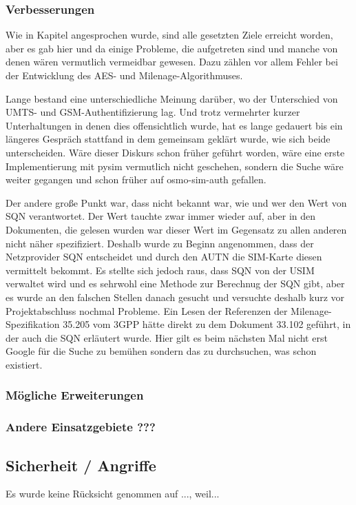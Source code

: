 		\subsubsection{Verbesserungen}
		Wie in Kapitel  angesprochen wurde, sind alle gesetzten Ziele
		erreicht worden, aber es gab hier und da einige Probleme, die aufgetreten sind und
		manche von denen wären vermutlich vermeidbar gewesen. Dazu zählen vor allem Fehler
		bei der Entwicklung des AES- und Milenage-Algorithmuses.
		
		Lange bestand eine unterschiedliche Meinung darüber, wo der Unterschied von UMTS-
		und GSM-Authentifizierung lag. Und trotz vermehrter kurzer Unterhaltungen in denen dies
		offensichtlich wurde, hat es lange gedauert bis ein längeres Gespräch stattfand in dem
		gemeinsam geklärt wurde, wie sich beide unterscheiden. Wäre dieser Diskurs schon früher
		geführt worden, wäre eine erste Implementierung mit pysim vermutlich nicht geschehen,
		sondern die Suche wäre weiter gegangen und schon früher auf osmo-sim-auth gefallen.
		
		Der andere große Punkt war, dass nicht bekannt war, wie und wer den Wert von SQN
		verantwortet. Der Wert tauchte zwar immer wieder auf, aber in den Dokumenten, die gelesen
		wurden war dieser Wert im Gegensatz zu allen anderen nicht näher spezifiziert. Deshalb
		wurde zu Beginn angenommen, dass der Netzprovider SQN entscheidet und durch den AUTN
		die SIM-Karte diesen vermittelt bekommt. Es stellte sich jedoch raus, dass SQN von der USIM
		verwaltet wird und es sehrwohl eine Methode zur Berechnug der SQN gibt, aber es wurde
		an den falschen Stellen danach gesucht und versuchte deshalb kurz vor Projektabschluss
		nochmal Probleme. Ein Lesen der Referenzen der Milenage-Spezifikation 35.205 vom 3GPP
		hätte direkt zu dem Dokument 33.102 geführt, in der auch die SQN erläutert wurde. Hier gilt es beim
		nächsten Mal nicht erst Google für die Suche zu bemühen sondern das zu durchsuchen, was
		schon existiert.
		
		\subsubsection{Mögliche Erweiterungen}
		
		
		\subsubsection{Andere Einsatzgebiete ???}
	\subsection{Sicherheit / Angriffe}
		Es wurde keine Rücksicht genommen auf ..., weil...
\clearpage